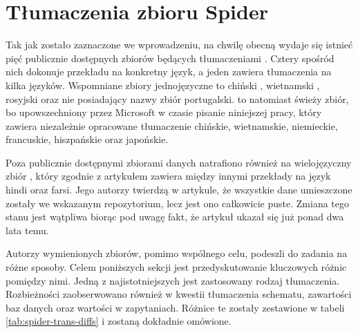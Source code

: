 \section{Tłumaczenia zbioru Spider}
Tak jak zostało zaznaczone we wprowadzeniu, na chwilę obecną wydaje się istnieć pięć publicznie dostępnych zbiorów będących tłumaczeniami . Cztery spośród nich dokonuje przekładu na konkretny język, a jeden zawiera tłumaczenia na kilka języków. Wspomniane zbiory jednojęzyczne to chiński , wietnamski , rosyjski  oraz nie posiadający nazwy zbiór portugalski.  to natomiast świeży zbiór, bo upowszechniony przez Microsoft w czasie pisanie niniejszej pracy, który zawiera niezależnie opracowane tłumaczenie chińskie, wietnamskie, niemieckie, francuskie, hiszpańskie oraz japońskie. 

Poza publicznie dostępnymi zbiorami danych natrafiono również na wielojęzyczny zbiór  , który zgodnie z artykułem zawiera między innymi przekłady na język hindi oraz farsi. Jego autorzy twierdzą w artykule, że wszystkie dane umieszczone zostały we wskazanym repozytorium, lecz jest ono całkowicie puste. Zmiana tego stanu jest wątpliwa biorąc pod uwagę fakt, że artykuł ukazał się już ponad dwa lata temu.

Autorzy wymienionych zbiorów, pomimo wspólnego celu, podeszli do zadania na różne sposoby. Celem poniższych sekcji jest przedyskutowanie kluczowych różnic pomiędzy nimi. Jedną z najistotniejszych jest zastosowany rodzaj tłumaczenia. Rozbieżności zaobserwowano również w kwestii tłumaczenia schematu, zawartości baz danych oraz wartości w zapytaniach. Różnice te zostały zestawione w tabeli \ref{tab:spider-trans-diffs} i zostaną dokładnie omówione.


